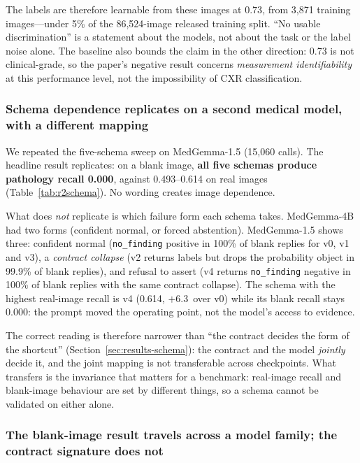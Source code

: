 The labels are therefore learnable from these images at $0.73$, from 3,871 training images---under 5\% of the 86{,}524-image released training split. ``No usable discrimination'' is a statement about the models, not about the task or the label noise alone. The baseline also bounds the claim in the other direction: 0.73 is not clinical-grade, so the paper's negative result concerns \emph{measurement identifiability} at this performance level, not the impossibility of CXR classification.

\subsubsection{Schema dependence replicates on a second medical model, with a different mapping}
\label{sec:results-schema2}

We repeated the five-schema sweep on MedGemma-1.5 (15,060 calls). The headline result replicates: on a blank image, \textbf{all five schemas produce pathology recall 0.000}, against 0.493--0.614 on real images (Table~\ref{tab:r2schema}). No wording creates image dependence.

What does \emph{not} replicate is which failure form each schema takes. MedGemma-4B had two forms (confident normal, or forced abstention). MedGemma-1.5 shows three: confident normal (\texttt{no\_finding} positive in 100\% of blank replies for v0, v1 and v3), a \emph{contract collapse} (v2 returns labels but drops the probability object in 99.9\% of blank replies), and refusal to assert (v4 returns \texttt{no\_finding} negative in 100\% of blank replies with the same contract collapse). The schema with the highest real-image recall is v4 (0.614, $+6.3$\,\pp{} over v0) while its blank recall stays 0.000: the prompt moved the operating point, not the model's access to evidence.

The correct reading is therefore narrower than ``the contract decides the form of the shortcut'' (Section~\ref{sec:results-schema}): the contract and the model \emph{jointly} decide it, and the joint mapping is not transferable across checkpoints. What transfers is the invariance that matters for a benchmark: real-image recall and blank-image behaviour are set by different things, so a schema cannot be validated on either alone.

\subsubsection{The blank-image result travels across a model family; the contract signature does not}
\label{sec:results-xfamily}

